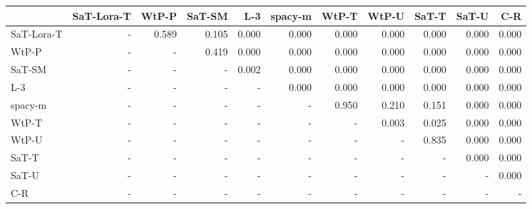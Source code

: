 \begin{tabular}{lrrrrrrrrrr}
\toprule
 & SaT-Lora-T & WtP-P & SaT-SM & L-3 & spacy-m & WtP-T & WtP-U & SaT-T & SaT-U & C-R \\
\midrule
SaT-Lora-T & - & 0.589 & 0.105 & 0.000 & 0.000 & 0.000 & 0.000 & 0.000 & 0.000 & 0.000 \\
WtP-P & - & - & 0.419 & 0.000 & 0.000 & 0.000 & 0.000 & 0.000 & 0.000 & 0.000 \\
SaT-SM & - & - & - & 0.002 & 0.000 & 0.000 & 0.000 & 0.000 & 0.000 & 0.000 \\
L-3 & - & - & - & - & 0.000 & 0.000 & 0.000 & 0.000 & 0.000 & 0.000 \\
spacy-m & - & - & - & - & - & 0.950 & 0.210 & 0.151 & 0.000 & 0.000 \\
WtP-T & - & - & - & - & - & - & 0.003 & 0.025 & 0.000 & 0.000 \\
WtP-U & - & - & - & - & - & - & - & 0.835 & 0.000 & 0.000 \\
SaT-T & - & - & - & - & - & - & - & - & 0.000 & 0.000 \\
SaT-U & - & - & - & - & - & - & - & - & - & 0.000 \\
C-R & - & - & - & - & - & - & - & - & - & - \\
\bottomrule
\end{tabular}

